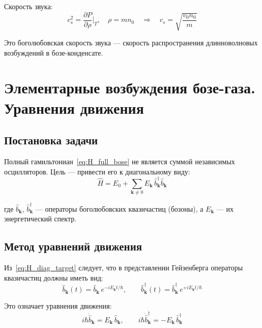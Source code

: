 \documentclass[../general/general]{subfiles}
\begin{document}
Скорость звука:
\begin{equation}
    c_s^2 = \frac{\partial P}{\partial \rho}\bigg|_T, \quad \rho = mn_0
    \quad \Rightarrow \quad \boxed{c_s = \sqrt{\frac{v_0 n_0}{m}}}
    \label{eq:sound_vel}
\end{equation}

Это боголюбовская скорость звука --- скорость распространения длинноволновых возбуждений в бозе-конденсате.



\section{Элементарные возбуждения бозе-газа. Уравнения движения}

\subsection{Постановка задачи}

Полный гамильтониан~\eqref{eq:H_full_bose} не является суммой независимых осцилляторов. Цель --- привести его к диагональному виду:
\begin{equation}
    \hat{H} = E_0 + \sum_{\mathbf{k}\neq 0} E_\mathbf{k}\,\hat{b}^\dagger_\mathbf{k}\hat{b}_\mathbf{k}
    \label{eq:H_diag_target}
\end{equation}

где $\hat{b}_\mathbf{k}$, $\hat{b}^\dagger_\mathbf{k}$ --- операторы боголюбовских квазичастиц (бозоны), а $E_\mathbf{k}$ --- их энергетический спектр.

\subsection{Метод уравнений движения}

Из~\eqref{eq:H_diag_target} следует, что в представлении Гейзенберга операторы квазичастиц должны иметь вид:
\begin{equation}
    \hat{b}_\mathbf{k}(t) = \hat{b}_\mathbf{k}\,e^{-iE_\mathbf{k}t/\hbar}, \qquad \hat{b}^\dagger_\mathbf{k}(t) = \hat{b}^\dagger_\mathbf{k}\,e^{+iE_\mathbf{k}t/\hbar}
\end{equation}

Это означает уравнения движения:
\begin{equation}
    i\hbar\dot{\hat{b}}_\mathbf{k} = E_\mathbf{k}\,\hat{b}_\mathbf{k}, \qquad i\hbar\dot{\hat{b}}^\dagger_\mathbf{k} = -E_\mathbf{k}\,\hat{b}^\dagger_\mathbf{k}
    \label{eq:eom_b}
\end{equation}
\end{document}
